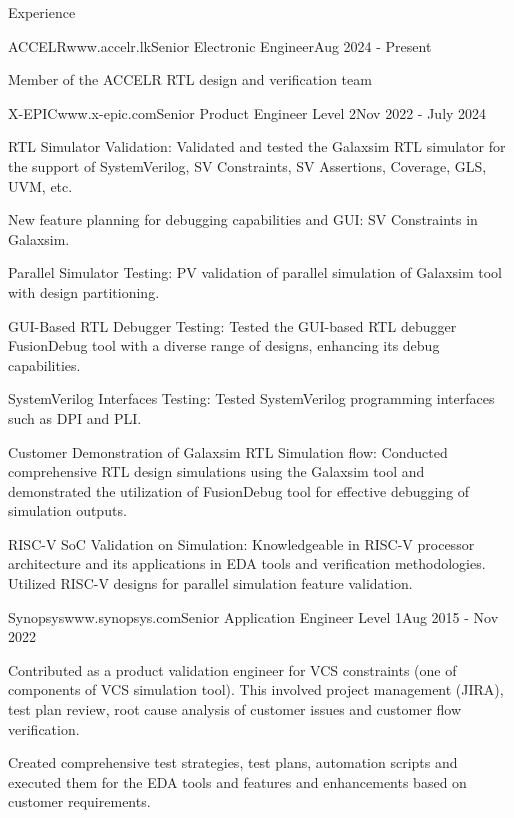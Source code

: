 \documentclass[
11pt, %
]{./assets/resume} %
\begin{document}
\begin{rSection}{Experience}
	\begin{rSubsectionX}{ACCELR}{www.accelr.lk}{Senior Electronic Engineer}{Aug 2024 - Present}
		\item Member of the ACCELR RTL design and verification team
	\end{rSubsectionX}
	\begin{rSubsectionX}{X-EPIC}{www.x-epic.com}{Senior Product Engineer Level 2}{Nov 2022 - July 2024}
		\item RTL Simulator Validation: Validated and tested the Galaxsim RTL simulator for the support of SystemVerilog, SV Constraints, SV Assertions, Coverage, GLS, UVM, etc.
		\item New feature planning for debugging capabilities and GUI: SV Constraints in Galaxsim.
		\item Parallel Simulator Testing: PV validation of parallel simulation of Galaxsim tool with design partitioning.
		\item GUI-Based RTL Debugger Testing: Tested the GUI-based RTL debugger FusionDebug tool with a diverse range of designs, enhancing its debug capabilities.
		\item SystemVerilog Interfaces Testing: Tested SystemVerilog programming interfaces such as DPI and PLI. 
		\item Customer Demonstration of Galaxsim RTL Simulation flow: Conducted comprehensive RTL design simulations using the Galaxsim tool and demonstrated the utilization of FusionDebug tool for effective debugging of simulation outputs.
		\item RISC-V SoC Validation on Simulation: Knowledgeable in RISC-V processor architecture and its applications in EDA tools and verification methodologies. Utilized RISC-V designs for parallel simulation feature validation.
	\end{rSubsectionX}
	\begin{rSubsectionX}{Synopsys}{www.synopsys.com}{Senior Application Engineer Level 1}{Aug 2015 - Nov 2022}
		\item Contributed as a product validation engineer for VCS constraints (one of components of VCS simulation tool). This involved project management (JIRA), test plan review, root cause analysis of customer issues and customer flow verification.
		\item Created comprehensive test strategies, test plans, automation scripts and executed them for the EDA tools and features and enhancements based on customer requirements.

\end{rSubsectionX}
\end{rSection}
\end{document}
